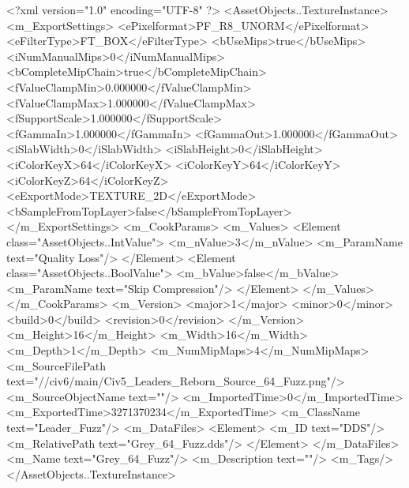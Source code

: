<?xml version="1.0" encoding="UTF-8" ?>
<AssetObjects..TextureInstance>
	<m_ExportSettings>
		<ePixelformat>PF_R8_UNORM</ePixelformat>
		<eFilterType>FT_BOX</eFilterType>
		<bUseMips>true</bUseMips>
		<iNumManualMips>0</iNumManualMips>
		<bCompleteMipChain>true</bCompleteMipChain>
		<fValueClampMin>0.000000</fValueClampMin>
		<fValueClampMax>1.000000</fValueClampMax>
		<fSupportScale>1.000000</fSupportScale>
		<fGammaIn>1.000000</fGammaIn>
		<fGammaOut>1.000000</fGammaOut>
		<iSlabWidth>0</iSlabWidth>
		<iSlabHeight>0</iSlabHeight>
		<iColorKeyX>64</iColorKeyX>
		<iColorKeyY>64</iColorKeyY>
		<iColorKeyZ>64</iColorKeyZ>
		<eExportMode>TEXTURE_2D</eExportMode>
		<bSampleFromTopLayer>false</bSampleFromTopLayer>
	</m_ExportSettings>
	<m_CookParams>
		<m_Values>
			<Element class="AssetObjects..IntValue">
				<m_nValue>3</m_nValue>
				<m_ParamName text="Quality Loss"/>
			</Element>
			<Element class="AssetObjects..BoolValue">
				<m_bValue>false</m_bValue>
				<m_ParamName text="Skip Compression"/>
			</Element>
		</m_Values>
	</m_CookParams>
	<m_Version>
		<major>1</major>
		<minor>0</minor>
		<build>0</build>
		<revision>0</revision>
	</m_Version>
	<m_Height>16</m_Height>
	<m_Width>16</m_Width>
	<m_Depth>1</m_Depth>
	<m_NumMipMaps>4</m_NumMipMaps>
	<m_SourceFilePath text="//civ6/main/Civ5_Leaders_Reborn\Texture_Source\Grey_64_Fuzz.png"/>
	<m_SourceObjectName text=""/>
	<m_ImportedTime>0</m_ImportedTime>
	<m_ExportedTime>3271370234</m_ExportedTime>
	<m_ClassName text="Leader_Fuzz"/>
	<m_DataFiles>
		<Element>
			<m_ID text="DDS"/>
			<m_RelativePath text="Grey_64_Fuzz.dds"/>
		</Element>
	</m_DataFiles>
	<m_Name text="Grey_64_Fuzz"/>
	<m_Description text=""/>
	<m_Tags/>
</AssetObjects..TextureInstance>


